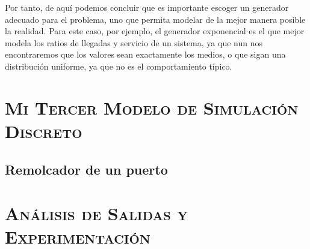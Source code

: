 \documentclass[11pt,a4paper]{article}
\begin{document}
Por tanto, de aquí podemos concluir que es importante escoger un generador
adecuado para el problema, uno que permita modelar de la mejor manera posible
la realidad. Para este caso, por ejemplo, el generador exponencial es el que
mejor modela los ratios de llegadas y servicio de un sistema, ya que nun
nos encontraremos que los valores sean exactamente los medios, o que sigan una
distribución uniforme, ya que no es el comportamiento típico.

\newpage

\section{\textsc{Mi Tercer Modelo de Simulación Discreto}}

\subsection{Remolcador de un puerto}

\section{\textsc{Análisis de Salidas y Experimentación}}
\end{document}
